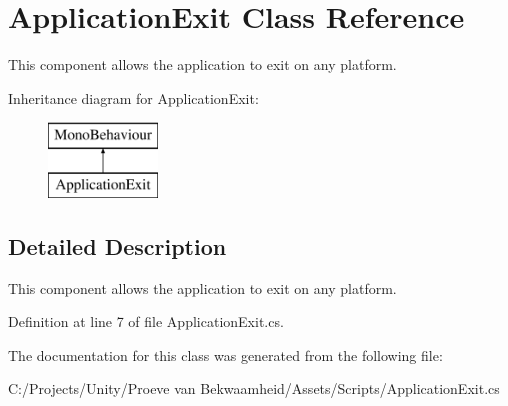 \hypertarget{class_application_exit}{\section{Application\+Exit Class Reference}
\label{class_application_exit}
}


This component allows the application to exit on any platform.  


Inheritance diagram for Application\+Exit\+:\begin{figure}[H]
\begin{center}
\leavevmode
\includegraphics[height=2.000000cm]{class_application_exit}
\end{center}
\end{figure}


\subsection{Detailed Description}
This component allows the application to exit on any platform. 



Definition at line 7 of file Application\+Exit.\+cs.



The documentation for this class was generated from the following file\+:\begin{DoxyCompactItemize}
\item 
C\+:/\+Projects/\+Unity/\+Proeve van Bekwaamheid/\+Assets/\+Scripts/Application\+Exit.\+cs\end{DoxyCompactItemize}

